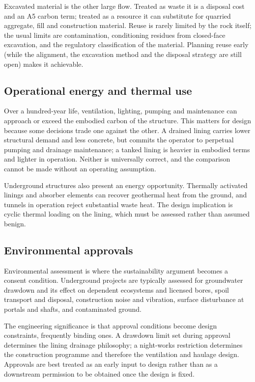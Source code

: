 Excavated material is the other large flow. Treated as waste it is a disposal
cost and an A5 carbon term; treated as a resource it can substitute for
quarried aggregate, fill and construction material. Reuse is
rarely limited by the rock itself; the usual limits are contamination, conditioning
residues from closed-face
excavation, and the regulatory classification of the material. Planning reuse
early (while the alignment, the excavation method and the disposal
strategy are still open) makes it achievable.

\subsection{Operational energy and thermal use}
\label{sec:operational-thermal}

Over a hundred-year life, ventilation, lighting, pumping and maintenance can
approach or exceed the embodied carbon of the structure. This matters for
design because some decisions trade one against the other. A drained lining
carries lower structural demand and less concrete, but commits the operator to
perpetual pumping and drainage maintenance; a tanked lining is heavier in
embodied terms and lighter in operation. Neither is universally correct, and
the comparison cannot be made without an operating assumption.

Underground structures also present an energy opportunity. Thermally activated
linings and absorber elements can recover geothermal heat from the ground, and
tunnels in operation reject substantial waste heat. The design implication is
cyclic thermal loading on the lining, which must be assessed rather than
assumed benign.

\subsection{Environmental approvals}
\label{sec:environmental-approvals}

Environmental assessment is where the sustainability argument becomes a
consent condition. Underground projects are typically assessed for groundwater
drawdown and its effect on dependent ecosystems and licensed bores, spoil
transport and disposal, construction noise and vibration, surface disturbance
at portals and shafts, and contaminated ground.

The engineering significance is that approval conditions become design
constraints, frequently binding ones. A drawdown limit set during approval
determines the lining drainage philosophy; a night-works restriction
determines the construction programme and therefore the ventilation and
haulage design. Approvals are best treated as an early input to design rather
than as a downstream permission to be obtained once the design is fixed.

